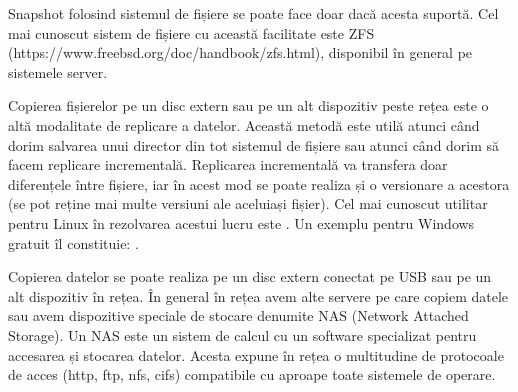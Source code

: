 Snapshot folosind sistemul de fișiere se poate face doar dacă acesta suportă.
Cel mai cunoscut sistem de fișiere cu această facilitate este ZFS
(https://www.freebsd.org/doc/handbook/zfs.html), disponibil în general pe
sistemele server.

Copierea fișierelor pe un disc extern sau pe un alt dispozitiv peste rețea este
o altă modalitate de replicare a datelor. Această metodă este utilă atunci când
dorim salvarea unui director din tot sistemul de fișiere sau atunci când dorim
să facem replicare incrementală. Replicarea incrementală va transfera doar
diferențele între fișiere, iar în acest mod se poate realiza și o versionare a
acestora (se pot reține mai multe versiuni ale aceluiași fișier). Cel mai
cunoscut utilitar pentru Linux în rezolvarea acestui lucru este . Un
exemplu pentru Windows gratuit îl constituie: .

Copierea datelor se poate realiza pe un disc extern conectat pe USB sau pe un
alt dispozitiv în rețea. În general în rețea avem alte servere pe care copiem
datele sau avem dispozitive speciale de stocare denumite NAS
 (Network Attached
Storage). Un NAS este un sistem de calcul cu un software specializat pentru
accesarea și stocarea datelor. Acesta expune în rețea o multitudine de
protocoale de acces (http, ftp, nfs, cifs) compatibile cu aproape toate
sistemele de operare.
